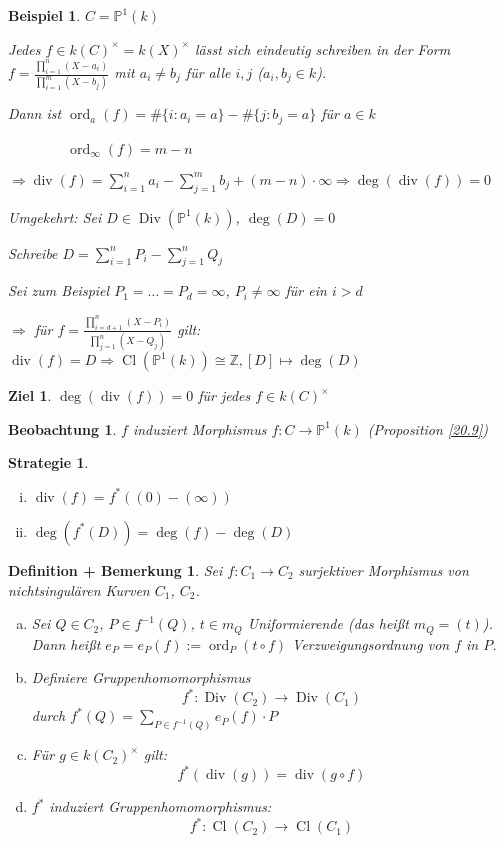 \documentclass[a4paper, 12pt, numbers=noendperiod, chapterprefix=true, headsepline]{scrbook}
\theoremstyle{break}
\newtheorem{DefBem}[Def]{Definition + Bemerkung}
\newtheorem{Bsp}[Def]{Beispiel}
\theoremstyle{nonumberbreak}
\newtheorem{Beo}{Beobachtung}
\newtheorem{Ziel}{Ziel}
\newtheorem{Strat}{Strategie}
\theoremstyle{nonumberplain}
\newcommand{\Sum}{\sum\limits}
\DeclareMathOperator{\Cl}{Cl}
\DeclareMathOperator{\Div}{Div}
\DeclareMathOperator{\Ddiv}{div}
\DeclareMathOperator{\ord}{ord}
\newcommand{\Z}{\mathbb{Z}}
\newcommand{\IP}{\mathbb{P}}%
\newcommand{\X}{\times}
\begin{document}
\begin{Bsp}
$C=\IP^1(k)$

Jedes $f\in k(C)^\X=k(X)^\X$ l\"asst sich eindeutig schreiben in der Form $f=\frac{\prod\limits_{i=1}^n(X-a_i)}{\prod\limits_{i=1}^m(X-b_j)}$ mit $a_i\neq b_j$ f\"ur alle $i,j$ ($a_i,b_j\in k$).

Dann ist $\ord_a(f)=\#\{i:a_i=a\}-\#\{j:b_j=a\}$ f\"ur $a\in k$

\textcolor{white}{Dann ist} $\ord_\infty(f)=m-n$

$\Rightarrow \Ddiv(f)=\Sum_{i=1}^na_i-\Sum_{j=1}^mb_j+(m-n)\cdot\infty \Rightarrow \deg(\Ddiv(f))=0$

\emph{Umgekehrt}: Sei $D\in \Div(\IP^1(k))$, $\deg(D)=0$

Schreibe $D=\Sum_{i=1}^nP_i-\Sum_{j=1}^{n}Q_j$

Sei zum Beispiel $P_1=\ldots =P_d=\infty$, $P_i\ne\infty$ f\"ur ein $i>d$

$\Rightarrow$ f\"ur $f=\frac{\prod\limits_{i=d+1}^n(X-P_i)}{\prod\limits_{j=1}^{n}(X-Q_j)}$ gilt: $\Ddiv(f)=D \Rightarrow \Cl(\IP^1(k))\cong\Z, [D]\mapsto\deg(D)$
\end{Bsp}

\begin{Ziel}
$\deg(\Ddiv(f))=0$ f\"ur jedes $f\in k(C)^\X$
\end{Ziel}

\begin{Beo}
$f$ induziert Morphismus $f:C\to\IP^1(k)$ (Proposition \ref{20.9})
\end{Beo}

\begin{Strat}\begin{enumerate}[i)]
\item
	$\Ddiv(f)=f^*((0)-(\infty))$
\item
	$\deg(f^*(D))=\deg(f)-\deg(D)$
\end{enumerate}\end{Strat}

\begin{DefBem}
Sei $f:C_1\to C_2$ surjektiver Morphismus von nichtsingul\"aren Kurven $C_1$, $C_2$.\begin{enumerate}[a)]
\item
	Sei $Q\in C_2$, $P\in f^{-1}(Q)$, $t\in m_Q$ Uniformierende (das hei\ss t $m_Q=(t)$). Dann hei\ss t $e_P=e_P(f):=\ord_P(t\circ f)$ Verzweigungsordnung von $f$ in $P$.
\item
	Definiere Gruppenhomomorphismus	
		\[f^*: \Div(C_2) \to \Div(C_1) \]
	durch $f^*(Q)=\Sum_{P\in f^{-1}(Q)}e_P(f)\cdot P$
\item
	F\"ur $g\in k(C_2)^\X$ gilt:
		\[ f^*(\Ddiv(g))=\Ddiv(g\circ f) \]
\item
	$f^*$ induziert Gruppenhomomorphismus:
		\[ f^*: \Cl(C_2) \to \Cl(C_1) \]
\end{enumerate}\end{DefBem}
\end{document}
